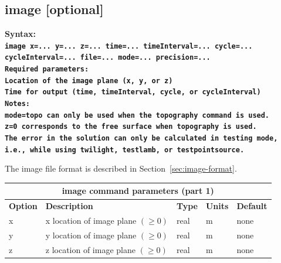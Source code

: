 \documentclass[11pt]{report}
\begin{document}
\subsection{image [optional]}
\label{keyword:image}
\begin{flushleft}
\bf Syntax:\\ \tt image x=... y=... z=...
time=... timeInterval=... cycle=... cycleInterval=... file=... mode=... precision=...\\ \bf Required
parameters:\\ \rm Location of the image plane (x, y, or z) \\ Time for output (time, timeInterval,
cycle, or cycleInterval)\\ \bf Notes: \\ \rm \verb+mode=topo+ can only be used when the
\verb+topography+ command is used.\\ \verb+z=0+ corresponds to the free surface when
\verb+topography+ is used.\\ The error in the solution can only be calculated in testing mode, i.e.,
while using \verb+twilight+, \verb+testlamb+, or \verb+testpointsource+.
\end{flushleft}
%
The image file format is described in Section~\ref{sec:image-format}.
%
\begin{center}
\begin{tabular}{|l|p{8cm}|l|l|l|} \hline
\multicolumn{5}{|c|}{\bf image command parameters (part 1)}\\ \hline
\bf{Option} & \bf{Description}                             & \bf{Type} & \bf{Units} & \bf{Default} \\ 
\hline \hline
x          & x location of image plane  $(\geq 0)$    & real    & m        & none \\ \hline
y          & y location of image plane  $(\geq 0)$    & real    & m        & none \\ \hline
z          & z location of image plane  $(\geq 0)$    & real    & m        & none \\ \hline
\end{tabular}
\end{center}
\end{document}
